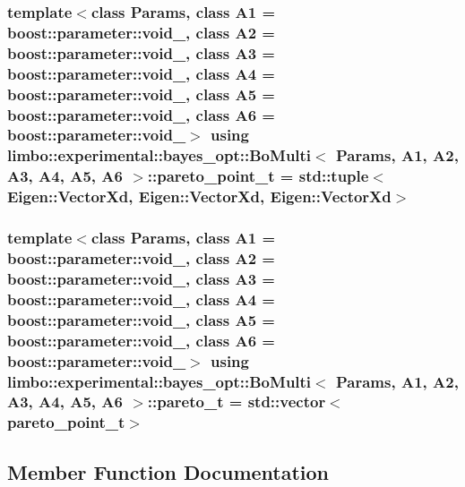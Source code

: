 \subsubsection[{pareto\+\_\+point\+\_\+t}]{\setlength{\rightskip}{0pt plus 5cm}template$<$class Params, class A1 = boost\+::parameter\+::void\+\_\+, class A2 = boost\+::parameter\+::void\+\_\+, class A3 = boost\+::parameter\+::void\+\_\+, class A4 = boost\+::parameter\+::void\+\_\+, class A5 = boost\+::parameter\+::void\+\_\+, class A6 = boost\+::parameter\+::void\+\_\+$>$ using {\bf limbo\+::experimental\+::bayes\+\_\+opt\+::\+Bo\+Multi}$<$ Params, A1, A2, A3, A4, A5, A6 $>$\+::{\bf pareto\+\_\+point\+\_\+t} =  std\+::tuple$<$Eigen\+::\+Vector\+Xd, Eigen\+::\+Vector\+Xd, Eigen\+::\+Vector\+Xd$>$}\label{classlimbo_1_1experimental_1_1bayes__opt_1_1_bo_multi_a5592d2f8141fec88904c0f60beb7ff2d}
\hypertarget{classlimbo_1_1experimental_1_1bayes__opt_1_1_bo_multi_aba7172aa379e749ea5cb85c8773e6408}{}
\subsubsection[{pareto\+\_\+t}]{\setlength{\rightskip}{0pt plus 5cm}template$<$class Params, class A1 = boost\+::parameter\+::void\+\_\+, class A2 = boost\+::parameter\+::void\+\_\+, class A3 = boost\+::parameter\+::void\+\_\+, class A4 = boost\+::parameter\+::void\+\_\+, class A5 = boost\+::parameter\+::void\+\_\+, class A6 = boost\+::parameter\+::void\+\_\+$>$ using {\bf limbo\+::experimental\+::bayes\+\_\+opt\+::\+Bo\+Multi}$<$ Params, A1, A2, A3, A4, A5, A6 $>$\+::{\bf pareto\+\_\+t} =  std\+::vector$<${\bf pareto\+\_\+point\+\_\+t}$>$}\label{classlimbo_1_1experimental_1_1bayes__opt_1_1_bo_multi_aba7172aa379e749ea5cb85c8773e6408}


\subsection{Member Function Documentation}
\hypertarget{classlimbo_1_1experimental_1_1bayes__opt_1_1_bo_multi_a50114c72da6ef12f29938df0c8b0bcc6}{}
